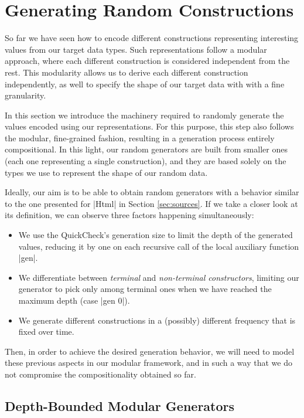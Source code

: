 \section{Generating Random Constructions}
\label{sec:generators}

%
So far we have seen how to encode different constructions representing
interesting values from our target data types.
%
Such representations follow a modular approach, where each different
construction is considered independent from the rest.
%
This modularity allows us to derive each different construction independently,
as well to specify the shape of our target data with with a fine granularity.


In this section we introduce the machinery required to randomly generate the
values encoded using our representations.
%
For this purpose, this step also follows the modular, fine-grained fashion,
resulting in a generation process entirely compositional.
%
In this light, our random generators are built from smaller ones (each one
representing a single construction), and they are based solely on the types we
use to represent the shape of our random data.

Ideally, our aim is to be able to obtain random generators with a behavior
similar to the one presented for |Html| in Section \ref{sec:sources}.
%
If we take a closer look at its definition, we can observe three factors
happening simultaneously:
%
\begin{itemize}
\item We use the QuickCheck's generation size to limit the depth of the
  generated values, reducing it by one on each recursive call of the local
  auxiliary function |gen|.
\item We differentiate between \emph{terminal} and \emph{non-terminal
    constructors}, limiting our generator to pick only among terminal ones when
  we have reached the maximum depth (case |gen 0|).
\item We generate different constructions in a (possibly) different frequency
  that is fixed over time.
\end{itemize}
%
Then, in order to achieve the desired generation behavior, we will need to model
these previous aspects in our modular framework, and in such a way that we do
not compromise the compositionality obtained so far.


%
\subsection{Depth-Bounded Modular Generators}

